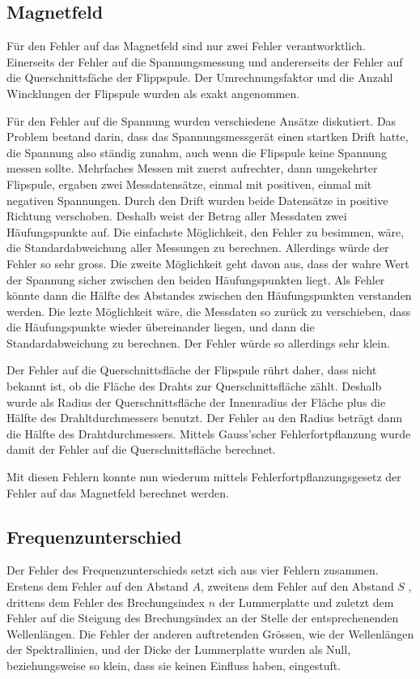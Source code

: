 \documentclass[a4paper,parskip,11pt, DIV12]{scrreprt}
\begin{document}
	\subsection{Magnetfeld}
	Für den Fehler auf das Magnetfeld sind nur zwei Fehler verantworktlich. Einerseits der Fehler auf die Spannungsmessung und andererseits der Fehler auf die Querschnittsfäche der Flippspule. Der Umrechnungsfaktor und die Anzahl Wincklungen der Flipspule wurden als exakt angenommen. 
	
	Für den Fehler auf die Spannung wurden verschiedene Ansätze diskutiert. Das Problem bestand darin, dass das Spannungsmessgerät einen startken Drift hatte, die Spannung also ständig zunahm, auch wenn die Flipspule keine Spannung messen sollte. Mehrfaches Messen mit zuerst aufrechter, dann umgekehrter Flipspule, ergaben zwei Messdatensätze, einmal mit positiven, einmal mit negativen Spannungen. Durch den Drift wurden beide Datensätze in positive Richtung verschoben. Deshalb weist der Betrag aller Messdaten zwei Häufungspunkte auf. Die einfachste Möglichkeit, den Fehler zu besimmen, wäre, die Standardabweichung aller Messungen zu berechnen. Allerdings würde der Fehler so sehr gross. Die zweite Möglichkeit geht davon aus, dass der wahre Wert der Spannung sicher zwischen den beiden Häufungspunkten liegt. Als Fehler könnte dann die Hälfte des Abstandes zwischen den Häufungspunkten verstanden werden. Die lezte Möglichkeit wäre, die Messdaten so zurück zu verschieben, dass die Häufungspunkte wieder übereinander liegen, und dann die Standardabweichung zu berechnen. Der Fehler würde so allerdings sehr klein.
	
	Der Fehler auf die Querschnittsfläche der Flipspule rührt daher, dass nicht bekannt ist, ob die Fläche des Drahts zur Querschnittsfläche zählt. Deshalb wurde als Radius der Querschnittsfläche der Innenradius der Fläche plus die Hälfte des Drahltdurchmessers benutzt. Der Fehler au den Radius beträgt dann die Hälfte des Drahtdurchmessers. Mittels Gauss'scher Fehlerfortpflanzung wurde damit der Fehler auf die Querschnittsfläche berechnet. 
	
	Mit diesen Fehlern konnte nun wiederum mittels Fehlerfortpflanzungsgesetz der Fehler auf das Magnetfeld berechnet werden.
	 
	\subsection{Frequenzunterschied}
	Der Fehler des Frequenzunterschieds setzt sich aus vier Fehlern zusammen. Erstens dem Fehler auf den Abstand $A$, zweitens dem Fehler auf den Abstand $S$ , drittens dem Fehler des Brechungsindex $n$ der Lummerplatte und zuletzt dem Fehler auf die Steigung des Brechungsindex an der Stelle der entsprechenenden Wellenlängen. Die Fehler der anderen auftretenden Grössen, wie der Wellenlängen der Spektrallinien, und der Dicke der Lummerplatte wurden als Null, beziehungsweise so klein, dass sie keinen Einfluss haben, eingestuft. 
	
\end{document}
